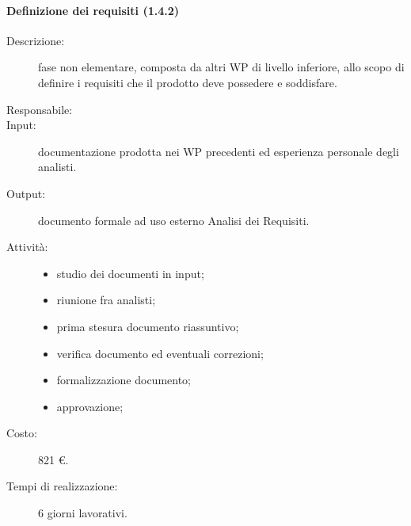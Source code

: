 \paragraph{Definizione dei requisiti (1.4.2)}
\begin{description}
\item[Descrizione:] fase non elementare, composta da altri WP di livello inferiore, allo scopo di definire i requisiti che il prodotto deve possedere e soddisfare.
\item[Responsabile:] 
\item[Input:] documentazione prodotta nei WP precedenti ed esperienza personale degli analisti.
\item[Output:] documento formale ad uso esterno Analisi dei Requisiti.
\item[Attivit\`{a}:] 
\begin{center}
\begin{itemize}
\item studio dei documenti in input;
\item riunione fra analisti;
\item prima stesura documento riassuntivo;
\item verifica documento ed eventuali correzioni;
\item formalizzazione documento;
\item approvazione;
\end{itemize}
\end{center}
\item[Costo:] 821 \euro{}.
\item[Tempi di realizzazione:] 6 giorni lavorativi.
\end{description}

